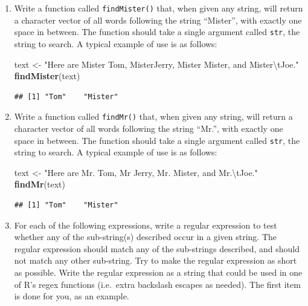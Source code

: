 \documentclass[]{book}
\makeatletter
\newenvironment{Shaded}{\begin{snugshade}}{\end{snugshade}}
\newcommand{\KeywordTok}[1]{\textcolor[rgb]{0.13,0.29,0.53}{\textbf{{#1}}}}
\newcommand{\CharTok}[1]{\textcolor[rgb]{0.31,0.60,0.02}{{#1}}}
\newcommand{\StringTok}[1]{\textcolor[rgb]{0.31,0.60,0.02}{{#1}}}
\newcommand{\NormalTok}[1]{{#1}}
\newenvironment{kframe}{%
\medskip{}
\setlength{\fboxsep}{.8em}
 \def\at@end@of@kframe{}%
 \ifinner\ifhmode%
  \def\at@end@of@kframe{\end{minipage}}%
  \begin{minipage}{\columnwidth}%
 \fi\fi%
 \def\FrameCommand##1{\hskip\@totalleftmargin \hskip-\fboxsep
 \colorbox{shadecolor}{##1}\hskip-\fboxsep
     \hskip-\linewidth \hskip-\@totalleftmargin \hskip\columnwidth}%
 \MakeFramed {\advance\hsize-\width
   \@totalleftmargin\z@ \linewidth\hsize
   \@setminipage}}%
 {\par\unskip\endMakeFramed%
 \at@end@of@kframe}
\renewenvironment{Shaded}{\begin{kframe}}{\end{kframe}}
\theoremstyle{definition}
\theoremstyle{definition}
\theoremstyle{remark}
\makeatother
\begin{document}
{\begin{enumerate}
\def\labelenumi{\arabic{enumi}.}
\item
  Write a function called \texttt{findMister()} that, when given any
  string, will return a character vector of all words following the
  string ``Mister'', with exactly one space in between. The function
  should take a single argument called \texttt{str}, the string to
  search. A typical example of use is as follows:

\begin{Shaded}
\begin{Highlighting}[]
\NormalTok{text <-}\StringTok{ "Here are Mister Tom, MisterJerry, Mister Mister, and Mister}\CharTok{\textbackslash{}t}\StringTok{Joe."}
\KeywordTok{findMister}\NormalTok{(text)}
\end{Highlighting}
\end{Shaded}

\begin{verbatim}
## [1] "Tom"    "Mister"
\end{verbatim}
\item
  Write a function called \texttt{findMr()} that, when given any string,
  will return a character vector of all words following the string
  ``Mr.'', with exactly one space in between. The function should take a
  single argument called \texttt{str}, the string to search. A typical
  example of use is as follows:

\begin{Shaded}
\begin{Highlighting}[]
\NormalTok{text <-}\StringTok{ "Here are Mr. Tom, Mr Jerry, Mr. Mister, and Mr.}\CharTok{\textbackslash{}t}\StringTok{Joe."}
\KeywordTok{findMr}\NormalTok{(text)}
\end{Highlighting}
\end{Shaded}

\begin{verbatim}
## [1] "Tom"    "Mister"
\end{verbatim}
\item
  For each of the following expressions, write a regular expression to
  test whether any of the sub-string(s) described occur in a given
  string. The regular expression should match any of the sub-strings
  described, and should not match any other sub-string. Try to make the
  regular expression as short as possible. Write the regular expression
  as a string that could be used in one of R's regex functions
  (i.e.~extra backslash escapes as needed). The first item is done for
  you, as an example.


\end{enumerate}}
\end{document}
